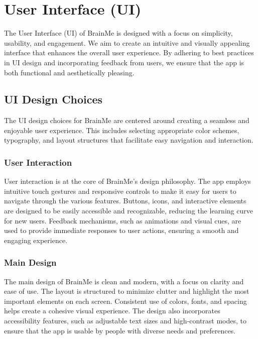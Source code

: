 \section{User Interface (UI)}
The User Interface (UI) of BrainMe is designed with a focus on simplicity, usability, and engagement. We aim to create an intuitive and visually appealing interface that enhances the overall user experience. By adhering to best practices in UI design and incorporating feedback from users, we ensure that the app is both functional and aesthetically pleasing.

\subsection{UI Design Choices}

The UI design choices for BrainMe are centered around creating a seamless and enjoyable user experience. This includes selecting appropriate color schemes, typography, and layout structures that facilitate easy navigation and interaction.

\subsubsection{User Interaction}

User interaction is at the core of BrainMe's design philosophy. The app employs intuitive touch gestures and responsive controls to make it easy for users to navigate through the various features. Buttons, icons, and interactive elements are designed to be easily accessible and recognizable, reducing the learning curve for new users. Feedback mechanisms, such as animations and visual cues, are used to provide immediate responses to user actions, ensuring a smooth and engaging experience.


\subsubsection{Main Design}

The main design of BrainMe is clean and modern, with a focus on clarity and ease of use. The layout is structured to minimize clutter and highlight the most important elements on each screen. Consistent use of colors, fonts, and spacing helps create a cohesive visual experience. The design also incorporates accessibility features, such as adjustable text sizes and high-contrast modes, to ensure that the app is usable by people with diverse needs and preferences.


